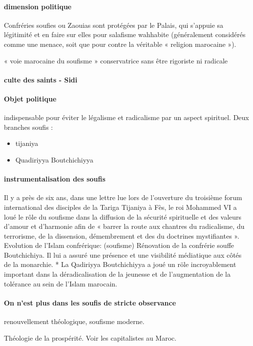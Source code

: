 \paragraph{dimension politique}
Confréries soufies ou
Zaouias sont
protégées par le Palais, qui s'appuie sa légitimité et en faire sur elles pour salafisme wahhabite (généralement considérés comme une menace, soit que  pour contre la  véritable « religion marocaine »). 


« voie marocaine du soufisme » conservatrice sans être rigoriste ni radicale

\paragraph{culte des saints - Sidi}

\paragraph{Objet politique} indispensable pour éviter le légalisme et radicalisme par un aspect spirituel.
Deux branches soufis : 
\begin{itemize}
    \item tijaniya
    \item Quadiriyya Boutchichiyya
\end{itemize}


\paragraph{instrumentalisation des soufis}

Il y a près de six ans, dans une lettre lue lors de l'ouverture du troisième forum international des disciples de la Tariga Tijaniya à Fès, le roi Mohammed VI a loué le rôle du soufisme dans la diffusion de la sécurité spirituelle et des valeurs d'amour et d'harmonie afin de « barrer la route aux chantres du radicalisme, du terrorisme, de la dissension, démembrement et des du doctrines mystifiantes ».
Evolution de l'Islam confrérique: (soufisme)   Rénovation de la confrérie souffe Boutchichiya.
Il lui a assuré une présence et une visibilité médiatique aux côtés de la monarchie.
* La Qadiriyya Boutchichiyya a joué un röle incroyablement important dans la déradicalisation de la jeunesse et de l'augmentation de la tolérance au sein de l'Islam marocain.

\paragraph{On n'est plus dans les soufis de stricte observance} renouvellement théologique, soufisme moderne. 
\begin{Ex}
    Théologie de la prospérité. Voir les capitalistes au Maroc.
\end{Ex}


